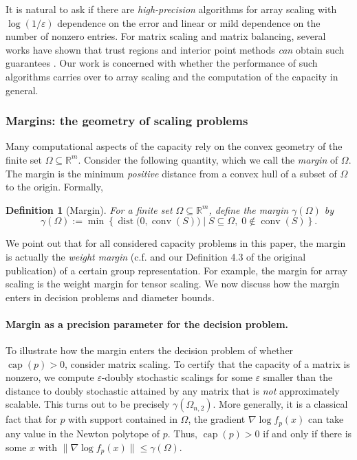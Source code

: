 \documentclass[10pt,a4paper]{article}
\newtheorem{dfn}[thm]{Definition}\crefname{dfn}{Definition}{Definitions}
\numberwithin{equation}{section}
\DeclareMathOperator{\conv}{conv}
\DeclareMathOperator{\dist}{dist}
\DeclareMathOperator{\capa}{cap}
\newcommand{\RR}{\mathbb R}
\newcommand{\eps}{\varepsilon}
\begin{document}
It is natural to ask if there are \emph{high-precision} algorithms for array scaling with $\log(1/\eps)$ dependence on the error and linear or mild dependence on the number of nonzero entries. For matrix scaling and matrix balancing, several works have shown that trust regions and interior point methods \emph{can} obtain such guarantees \cite{cohen2017matrix,allen2017much}.
Our work is concerned with whether the performance of such algorithms carries over to array scaling and the computation of the capacity in general.




\setcounter{thm}{1}\subsubsection{Margins: the geometry of scaling problems}
Many computational aspects of the capacity rely on the convex geometry of the finite set $\Omega \subseteq \RR^m$. Consider the following quantity, which we call the \emph{margin} of $\Omega$. 
The margin is the minimum \emph{positive} distance from a convex hull of a subset of $\Omega$ to the origin. Formally,
\begin{dfn}[Margin]\label{dfn:margin} For a finite set $\Omega \subseteq \RR^m$, define the margin $\gamma(\Omega)$ by
	\[ \gamma(\Omega) := \min \left\lbrace \dist \big(0, \conv(S) \big) \mid S \subseteq \Omega, \; 0 \notin \conv(S) \right\rbrace.\]
\end{dfn}
We point out that for all considered capacity problems in this paper, the margin is actually the \emph{weight margin} (c.f. \cite{gradflow} and our Definition 4.3 of the original publication) of a certain group representation. For example, the margin for array scaling is the weight margin for tensor scaling. 
We now discuss how the margin enters in decision problems and diameter bounds.


\paragraph{Margin as a precision parameter for the decision problem.}


To illustrate how the margin enters the decision problem of whether $\capa(p) > 0$, consider matrix scaling.
To certify that the capacity of a matrix is nonzero, we compute $\eps$-doubly stochastic scalings for some $\eps$ smaller than the distance to doubly stochastic attained by any matrix that is \emph{not} approximately scalable. This turns out to be precisely $\gamma(\Omega_{n,2})$. More generally, it is a classical fact that for $p$ with support contained in $\Omega$, the gradient $\nabla \log f_p(x)$ can take any value in the Newton polytope of $p$. Thus, $\capa(p) > 0$ if and only if there is some $x$ with $\|\nabla \log f_p(x)\| \leq \gamma(\Omega)$.
\end{document}
